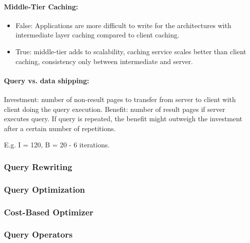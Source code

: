 \paragraph{Middle-Tier Caching:}
\begin{itemize}
    \item False: Applications are more difficult to write for the architectures with intermediate layer caching compared to client caching.
    \item True: middle-tier adds to scalability, caching service scales better than client caching, consistency only between intermediate and server.
\end{itemize}

\paragraph{Query vs. data shipping:}
Investment: number of non-result pages to transfer from server to client with client doing the query execution. Benefit: number of result pages if server executes query. If query is repeated, the benefit might outweigh the investment after a certain number of repetitions.

E.g. I = 120, B = 20 - 6 iterations.



\subsubsection{Query Rewriting}

\subsubsection{Query Optimization}

\subsubsection{Cost-Based Optimizer}

\subsubsection{Query Operators}
